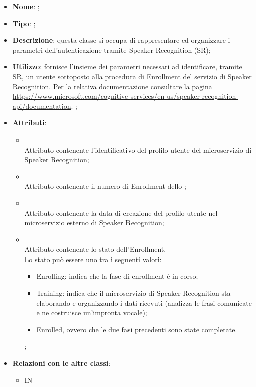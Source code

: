 \begin{itemize}
	\item \textbf{Nome}: ;
	\item \textbf{Tipo}: ;
	\item \textbf{Descrizione}: questa classe si occupa di rappresentare ed organizzare i parametri dell'autenticazione tramite Speaker Recognition (SR);
	\item \textbf{Utilizzo}: fornisce l'insieme dei parametri necessari ad identificare, tramite SR, un utente sottoposto alla procedura di Enrollment del servizio di Speaker Recognition.
Per la relativa documentazione consultare la pagina \url{https://www.microsoft.com/cognitive-services/en-us/speaker-recognition-api/documentation}.
;
	\item \textbf{Attributi}:
	\begin{itemize}
		\item[]  \\
		Attributo contenente l'identificativo del profilo utente del microservizio di Speaker Recognition;
		\item[]  \\
		Attributo contenente il numero di Enrollment dello ;
		\item[]  \\
		Attributo contenente la data di creazione del profilo utente nel microservizio esterno di Speaker Recognition;
		\item[]  \\
		Attributo contenente lo stato dell'Enrollment.\\
Lo stato può essere uno tra i seguenti valori:
\begin{itemize} \item Enrolling: indica che la fase di enrollment è in corso; \item Training: indica che il microservizio di Speaker Recognition sta elaborando e organizzando i dati ricevuti (analizza le frasi comunicate e ne costruisce un'impronta vocale); \item Enrolled, ovvero che le due fasi precedenti sono state completate. \end{itemize};
	\end{itemize}
	\item \textbf{Relazioni con le altre classi}:
	\begin{itemize}
		\item IN \hyperlink{<<interface>>VocalLoginModule_label}{}
	\end{itemize}
\end{itemize}
\FloatBarrier

